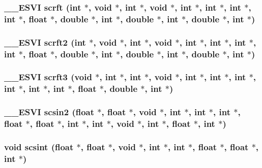 \subsubsection{\setlength{\rightskip}{0pt plus 5cm}\_\-\_\-ESVI scrft (int $\ast$, void $\ast$, int $\ast$, void $\ast$, int $\ast$, int $\ast$, int $\ast$, int $\ast$, float $\ast$, double $\ast$, int $\ast$, double $\ast$, int $\ast$, double $\ast$, int $\ast$)}\label{essl_8h_2c1c17565881f64c18039aeb3509aa10}


\subsubsection{\setlength{\rightskip}{0pt plus 5cm}\_\-\_\-ESVI scrft2 (int $\ast$, void $\ast$, int $\ast$, void $\ast$, int $\ast$, int $\ast$, int $\ast$, int $\ast$, float $\ast$, double $\ast$, int $\ast$, double $\ast$, int $\ast$, double $\ast$, int $\ast$)}\label{essl_8h_67581b49854d9ebbb436ac9de0180068}


\subsubsection{\setlength{\rightskip}{0pt plus 5cm}\_\-\_\-ESVI scrft3 (void $\ast$, int $\ast$, int $\ast$, void $\ast$, int $\ast$, int $\ast$, int $\ast$, int $\ast$, int $\ast$, int $\ast$, float $\ast$, double $\ast$, int $\ast$)}\label{essl_8h_0f4bcad54f50cd0eaf5eb83f90ed46ea}


\subsubsection{\setlength{\rightskip}{0pt plus 5cm}\_\-\_\-ESVI scsin2 (float $\ast$, float $\ast$, void $\ast$, int $\ast$, int $\ast$, int $\ast$, float $\ast$, float $\ast$, int $\ast$, int $\ast$, void $\ast$, int $\ast$, float $\ast$, int $\ast$)}\label{essl_8h_8856b6b29dcf2ecb8066bb8ce4e169df}


\subsubsection{\setlength{\rightskip}{0pt plus 5cm}void scsint (float $\ast$, float $\ast$, void $\ast$, int $\ast$, int $\ast$, float $\ast$, float $\ast$, int $\ast$)}\label{essl_8h_cf7d874c94c6c494bb550fa3f09041ef}


